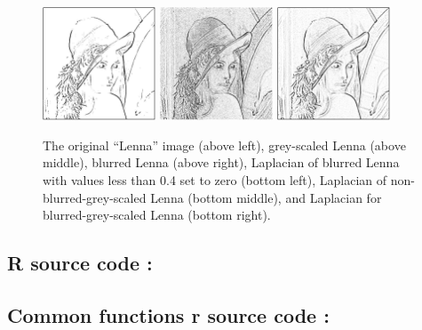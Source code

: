 \begin{figure}[H]
    \includegraphics[width=0.30\textwidth]{images/lenna_blurred_tol_laplace.jpeg}
    \quad
    \includegraphics[width=0.30\textwidth]{images/lenna_laplace.jpeg}
    \quad
    \includegraphics[width=0.30\textwidth]{images/lenna_blurred_laplace.jpeg}
  \caption{The original ``Lenna'' image (above left), grey-scaled Lenna (above middle), blurred Lenna (above right), Laplacian of blurred Lenna with values less than 0.4 set to zero (bottom left), Laplacian of non-blurred-grey-scaled Lenna (bottom middle), and Laplacian for blurred-grey-scaled Lenna (bottom right).}
\end{figure}

\subsection{R source code :}


\newpage

\subsection{Common functions r source code :}

\begin{multicols}{2}


\end{multicols}





